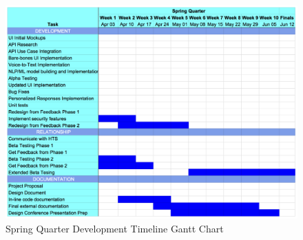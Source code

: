 \begin{figure}[htb]
\centering
\includegraphics[width =\textwidth]{springQuarter.png}
\caption{Spring Quarter Development Timeline Gantt Chart}
\label{fig:springQuarter}
\end{figure}